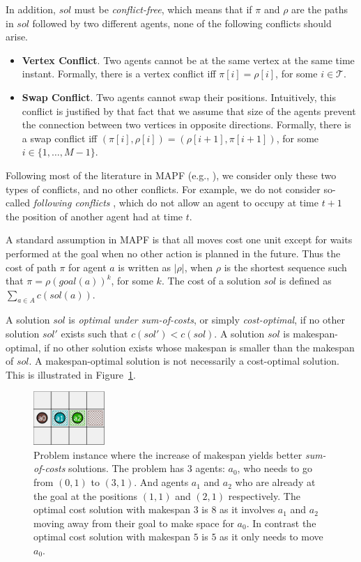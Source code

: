 In addition, $sol$ must be \emph{conflict-free}, which means that if $\pi$ and $\rho$ are the paths in $sol$ followed by two different agents, none of the following conflicts should arise.
\begin{itemize}
    \item \textbf{Vertex Conflict}. Two agents cannot be at the same vertex at the same time instant. Formally, there is a vertex conflict iff $\pi[i]=\rho[i]$, for some $i\in\mathcal{T}$.
    \item \textbf{Swap Conflict}. Two agents cannot swap their positions. Intuitively, this conflict is justified by that fact that we assume that size of the agents prevent the connection between two vertices in opposite directions. Formally, there is a swap conflict iff $(\pi[i],\rho[i])=(\rho[i+1],\pi[i+1])$, for some $i\in\{1,\ldots,M-1\}$.
\end{itemize}
Following most of the literature in MAPF (e.g., ), we consider only these two types of conflicts, and no other conflicts. For example, we do not consider so-called \emph{following conflicts} \cite{SternSFK0WLA0KB19}, which do not allow an agent to occupy at time $t+1$ the position of another agent had at time $t$.

A standard assumption in MAPF is that all moves cost one unit except for waits performed at the goal when no other action is planned in the future. Thus the cost of path $\pi$ for agent $a$ is written as $|\rho|$, when $\rho$ is the shortest sequence such that $\pi=\rho(goal(a))^k$, for some $k$. The cost of a solution $sol$ is defined as $\sum_{a\in A} c(sol(a))$.

A solution $sol$ is \emph{optimal under sum-of-costs}, or simply \emph{cost-optimal}, if no other solution $sol'$ exists such that $c(sol')<c(sol)$. A solution $sol$ is makespan-optimal, if no other solution exists whose makespan is smaller than the makespan of $sol$. A makespan-optimal solution is not necessarily a cost-optimal solution. This is illustrated in Figure~\ref{fig:makespancost}.

\begin{figure}
    \centering
    \includegraphics[width=0.24\textwidth]{graphs/makespangrid.PNG}
      \caption{Problem instance where the increase of makespan yields better \emph{sum-of-costs} solutions. The problem has 3 agents:  $a_0$, who needs to go from $(0,1)$ to $(3,1)$. And agents $a_1$ and $a_2$ who are already at the goal at the positions $(1,1)$ and $(2,1)$ respectively. The optimal cost solution with makespan $3$ is $8$ as it involves $a_1$ and $a_2$ moving away from their goal to make space for $a_0$. In contrast the optimal cost solution with makespan $5$ is $5$ as it only needs to move $a_0$.}
    \label{fig:makespancost}
\end{figure}


